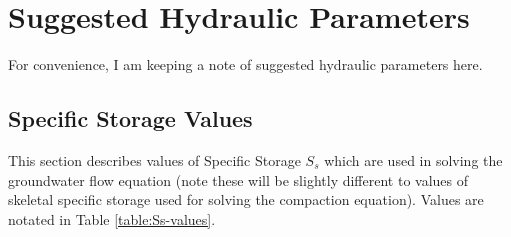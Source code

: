 \documentclass{article}
\begin{document}
\section{Suggested Hydraulic Parameters}

For convenience, I am keeping a note of suggested hydraulic parameters here. 

\subsection{Specific Storage Values}

This section describes values of Specific Storage $S_s$ which are used in solving the groundwater flow equation (note these will be slightly different to values of skeletal specific storage used for solving the compaction equation). Values are notated in Table \ref{table:Ss-values}.
\end{document}
